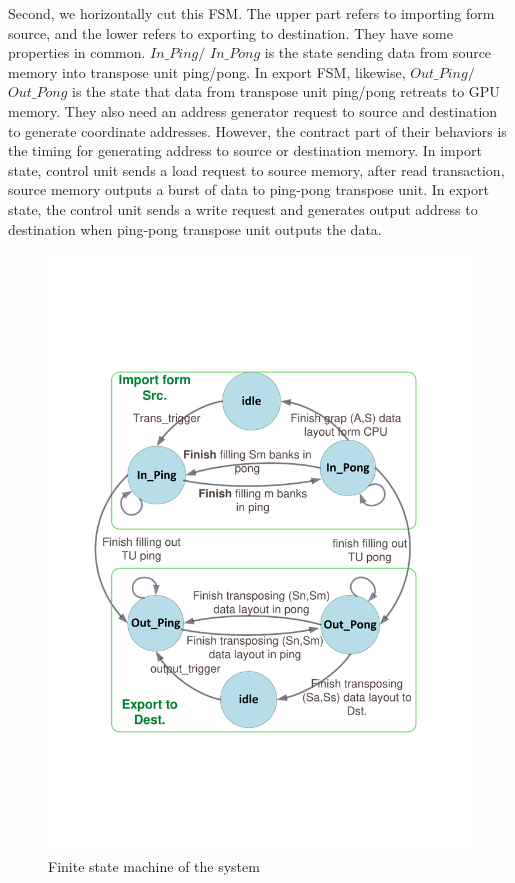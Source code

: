 \documentclass[10pt,journal,compsoc]{IEEEtran}
\begin{document}
Second, we horizontally cut this FSM.
The upper part refers to importing form source, and the lower refers to exporting to destination. They have some properties in common. $ In\_Ping/$ $ In\_Pong $ is the state sending data from source memory into transpose unit ping/pong. In export FSM, likewise, $ Out\_Ping/$ $Out \_Pong $ is the state that data from transpose unit ping/pong retreats to GPU memory. They also need an address generator request to source and destination to generate coordinate addresses. However, the contract part of their behaviors is the timing for generating address to source or destination memory. In import state, control unit sends a load request to source memory, after read transaction, source memory outputs a burst of data to ping-pong transpose unit. In export state, the control unit sends a write request and generates output address to destination when ping-pong transpose unit outputs the data.

\begin{figure}[bt]
\begin{center}
\graphicspath{{picture/}}
\includegraphics[scale=0.5]{FSM_v02}
\caption{Finite state machine of the system}
\label{fig:FSM}
\end{center}
\end{figure}
\end{document}
